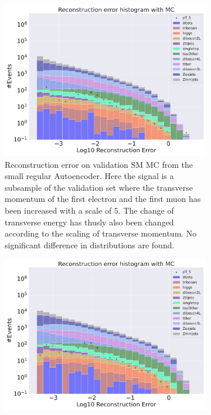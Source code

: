 \begin{figure}[h!]
    \centering
    \begin{subfigure}{.45\textwidth}
        \includegraphics[width=\textwidth]{Figures/AE_testing/small/b_data_recon_big_rm3_feats_sig_pT_5.pdf}
        \caption{Reconstruction error on validation SM MC from the small regular Autoencoder. Here the signal is a subsample of the validation 
        set where the transverse momentum of the first electron and the first muon has been increased with a scale of $5$. The change of transverse 
        energy has thusly also been changed according to the scaling of transverse momentum. No significant difference in distributions are found. }
        \label{fig:ae_small_pt_5}
    \end{subfigure}
    \hfill 
    \begin{subfigure}{.45\textwidth}
        \includegraphics[width=\textwidth]{Figures/AE_testing/big/b_data_recon_big_rm3_feats_sig_pT_5.pdf}

\end{subfigure}
\end{figure}
